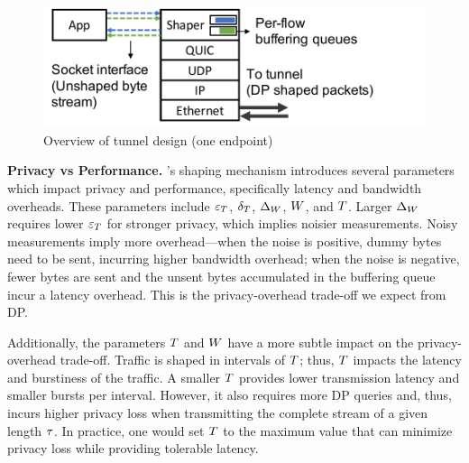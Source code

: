 \begin{figure}[t]
    \centering
    \includegraphics[width=\columnwidth]{design2.pdf}
    \caption{Overview of tunnel design (one endpoint)
    }
    \vspace{-0.4cm}
    \label{fig:minesvpn-overview}
\end{figure}




\textbf{Privacy vs Performance.}
\sys's shaping mechanism introduces several parameters which impact privacy and
performance, specifically latency and bandwidth overheads. These parameters
include $\varepsilon_T$, $\delta_T$, $\Delta_{W}$, $W$, and
$T$.
%
Larger $\Delta_{W}$ requires lower $\varepsilon_{T}$ for stronger privacy,
which implies noisier measurements.
Noisy measurements imply more overhead---when the noise is positive, dummy bytes
need to be sent, incurring higher bandwidth overhead; when the noise is
negative, fewer bytes are sent and the unsent bytes accumulated in the buffering
queue incur a latency overhead.
This is the privacy-overhead trade-off we expect from DP.

Additionally, the parameters $T$ and $W$ have a more subtle impact
on the privacy-overhead trade-off.
Traffic is shaped in intervals of $T$; thus, $T$ impacts the
latency and burstiness of the traffic.
A smaller $T$ provides lower transmission latency and smaller bursts per
interval. However, it also requires more DP queries and, thus, incurs higher
privacy loss when transmitting the complete stream of a given length
$\tau$.
In practice, one would set $T$ to the maximum value that can minimize
privacy loss while providing tolerable latency.

